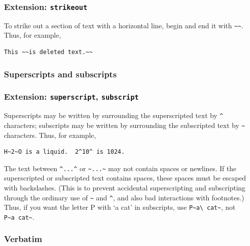 \documentclass[
]{article}
\begin{document}
\hypertarget{extension-strikeout}{%
\subsubsection{\texorpdfstring{Extension:
\texttt{strikeout}}{Extension: strikeout}}\label{extension-strikeout}}

To strike out a section of text with a horizontal line, begin and end it
with \texttt{\textasciitilde{}\textasciitilde{}}. Thus, for example,

\begin{verbatim}
This ~~is deleted text.~~
\end{verbatim}

\hypertarget{superscripts-and-subscripts}{%
\subsubsection{Superscripts and
subscripts}\label{superscripts-and-subscripts}}

\hypertarget{extension-superscript-subscript}{%
\subsubsection{\texorpdfstring{Extension: \texttt{superscript},
\texttt{subscript}}{Extension: superscript, subscript}}\label{extension-superscript-subscript}}

Superscripts may be written by surrounding the superscripted text by
\texttt{\^{}} characters; subscripts may be written by surrounding the
subscripted text by \texttt{\textasciitilde{}} characters. Thus, for
example,

\begin{verbatim}
H~2~O is a liquid.  2^10^ is 1024.
\end{verbatim}

The text between \texttt{\^{}...\^{}} or
\texttt{\textasciitilde{}...\textasciitilde{}} may not contain spaces or
newlines. If the superscripted or subscripted text contains spaces,
these spaces must be escaped with backslashes. (This is to prevent
accidental superscripting and subscripting through the ordinary use of
\texttt{\textasciitilde{}} and \texttt{\^{}}, and also bad interactions
with footnotes.) Thus, if you want the letter P with `a cat' in
subscripts, use
\texttt{P\textasciitilde{}a\textbackslash{}\ cat\textasciitilde{}}, not
\texttt{P\textasciitilde{}a\ cat\textasciitilde{}}.

\hypertarget{verbatim}{%
\subsubsection{Verbatim}\label{verbatim}}
\end{document}
